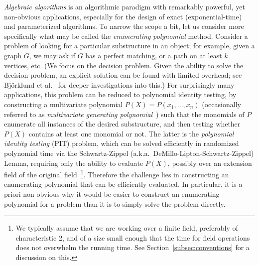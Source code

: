 \documentclass{theoretics}
\begin{document}
\emph{Algebraic algorithms} is an algorithmic paradigm with 
remarkably powerful, yet non-obvious applications, especially for the design of  exact (exponential-time) and
parameterized algorithms. To narrow the scope a bit, let us consider
more specifically what may be called the \emph{enumerating polynomial}
method. Consider a problem of looking for a particular substructure in
an object; for example, given a graph $G$, we may ask if $G$ has a
perfect matching, or a path on at least $k$ vertices, etc. (We
  focus on the decision problem. Given the ability to solve the
  decision problem, an explicit solution can be found with limited
  overhead; see Bj\"orklund et al.~\cite{BjorklundKK14witness,BjorklundKKL15alenex} 
  for deeper investigations into this.)
For surprisingly many applications, this problem can be reduced to
polynomial identity testing, by constructing a multivariate polynomial
$P(X)=P(x_1,\ldots,x_n)$ (occasionally referred to as \emph{multivariate generating polynomial}~\cite{Brand19thesis})
such that the monomials of $P$ enumerate all
instances of the desired substructure, and then testing
whether $P(X)$ contains at least one monomial or not. The latter is
the \emph{polynomial identity testing} (PIT) problem, which can be
solved efficiently in randomized polynomial time via the Schwartz-Zippel
(a.k.a.\ DeMillo-Lipton-Schwartz-Zippel) Lemma, requiring only the ability
to evaluate $P(X)$, possibly over an extension field of the original
field~\cite{Schwartz80,Zippel79}\footnote{We typically assume that we are working over a
  finite field, preferably of characteristic 2, and of a size small enough that the time for field operations does not overwhelm the running time. 
  See Section~\ref{subsec:conventions} for a discussion on this.}.
Therefore the challenge lies in
constructing an enumerating polynomial that can be
efficiently evaluated. In particular, it is a priori non-obvious why
it would be easier to construct an enumerating polynomial for a
problem than it is to simply solve the problem directly. 
\end{document}
